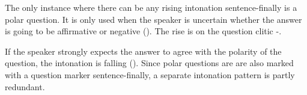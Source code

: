 






The only instance where there can be any rising intonation sentence-finally is a polar question.  It is only used when the speaker is uncertain whether the answer is going to be affirmative or negative ().  The rise is on the question clitic -.  





If the speaker strongly expects the answer to agree with the polarity of the question, the intonation is falling (). Since polar questions are are also marked with a question marker \textstyleStyleVernacularWordsItalic{=} sentence-finally, a separate intonation pattern is partly redundant.





